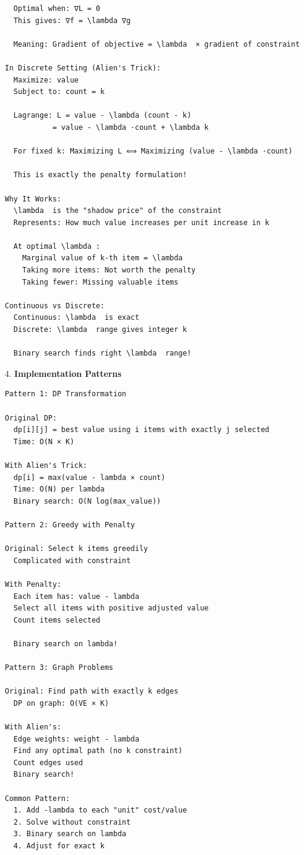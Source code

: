 \documentclass[11pt,a4paper,oneside]{book}
\begin{document}
\begin{tcolorbox}[
    enhanced,breakable,
    colback=white,
    colframe=deepblue,
    boxrule=1.5pt,
    arc=3mm,
    title=\textbf{The Ultimate DP Optimization}
]
\begin{verbatim}
  Optimal when: ∇L = 0
  This gives: ∇f = \lambda ∇g
  
  Meaning: Gradient of objective = \lambda  × gradient of constraint

In Discrete Setting (Alien's Trick):
  Maximize: value
  Subject to: count = k
  
  Lagrange: L = value - \lambda (count - k)
           = value - \lambda ·count + \lambda k
  
  For fixed k: Maximizing L ⟺ Maximizing (value - \lambda ·count)
  
  This is exactly the penalty formulation!

Why It Works:
  \lambda  is the "shadow price" of the constraint
  Represents: How much value increases per unit increase in k
  
  At optimal \lambda :
    Marginal value of k-th item = \lambda 
    Taking more items: Not worth the penalty
    Taking fewer: Missing valuable items

Continuous vs Discrete:
  Continuous: \lambda  is exact
  Discrete: \lambda  range gives integer k
  
  Binary search finds right \lambda  range!
\end{verbatim}

4. \textbf{Implementation Patterns}
\begin{verbatim}
Pattern 1: DP Transformation

Original DP:
  dp[i][j] = best value using i items with exactly j selected
  Time: O(N × K)

With Alien's Trick:
  dp[i] = max(value - lambda × count)
  Time: O(N) per lambda
  Binary search: O(N log(max_value))

Pattern 2: Greedy with Penalty

Original: Select k items greedily
  Complicated with constraint

With Penalty:
  Each item has: value - lambda
  Select all items with positive adjusted value
  Count items selected
  
  Binary search on lambda!

Pattern 3: Graph Problems

Original: Find path with exactly k edges
  DP on graph: O(VE × K)

With Alien's:
  Edge weights: weight - lambda
  Find any optimal path (no k constraint)
  Count edges used
  Binary search!

Common Pattern:
  1. Add -lambda to each "unit" cost/value
  2. Solve without constraint
  3. Binary search on lambda
  4. Adjust for exact k
\end{verbatim}


\end{tcolorbox}
\end{document}
